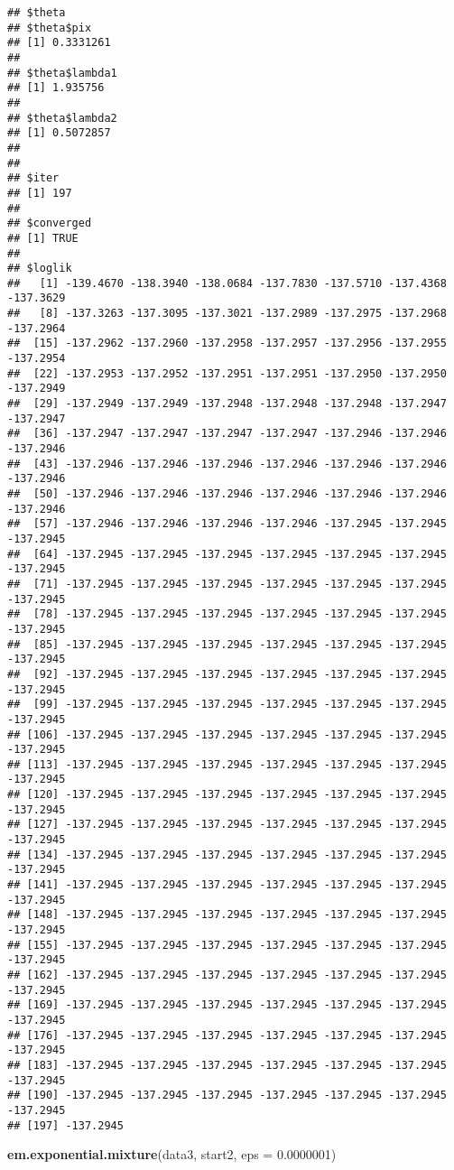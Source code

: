 \documentclass[]{article}
\newenvironment{Shaded}{\begin{snugshade}}{\end{snugshade}}
\newcommand{\DataTypeTok}[1]{\textcolor[rgb]{0.13,0.29,0.53}{#1}}
\newcommand{\FloatTok}[1]{\textcolor[rgb]{0.00,0.00,0.81}{#1}}
\newcommand{\KeywordTok}[1]{\textcolor[rgb]{0.13,0.29,0.53}{\textbf{#1}}}
\newcommand{\NormalTok}[1]{#1}
\begin{document}
\begin{verbatim}
## $theta
## $theta$pix
## [1] 0.3331261
## 
## $theta$lambda1
## [1] 1.935756
## 
## $theta$lambda2
## [1] 0.5072857
## 
## 
## $iter
## [1] 197
## 
## $converged
## [1] TRUE
## 
## $loglik
##   [1] -139.4670 -138.3940 -138.0684 -137.7830 -137.5710 -137.4368 -137.3629
##   [8] -137.3263 -137.3095 -137.3021 -137.2989 -137.2975 -137.2968 -137.2964
##  [15] -137.2962 -137.2960 -137.2958 -137.2957 -137.2956 -137.2955 -137.2954
##  [22] -137.2953 -137.2952 -137.2951 -137.2951 -137.2950 -137.2950 -137.2949
##  [29] -137.2949 -137.2949 -137.2948 -137.2948 -137.2948 -137.2947 -137.2947
##  [36] -137.2947 -137.2947 -137.2947 -137.2947 -137.2946 -137.2946 -137.2946
##  [43] -137.2946 -137.2946 -137.2946 -137.2946 -137.2946 -137.2946 -137.2946
##  [50] -137.2946 -137.2946 -137.2946 -137.2946 -137.2946 -137.2946 -137.2946
##  [57] -137.2946 -137.2946 -137.2946 -137.2946 -137.2945 -137.2945 -137.2945
##  [64] -137.2945 -137.2945 -137.2945 -137.2945 -137.2945 -137.2945 -137.2945
##  [71] -137.2945 -137.2945 -137.2945 -137.2945 -137.2945 -137.2945 -137.2945
##  [78] -137.2945 -137.2945 -137.2945 -137.2945 -137.2945 -137.2945 -137.2945
##  [85] -137.2945 -137.2945 -137.2945 -137.2945 -137.2945 -137.2945 -137.2945
##  [92] -137.2945 -137.2945 -137.2945 -137.2945 -137.2945 -137.2945 -137.2945
##  [99] -137.2945 -137.2945 -137.2945 -137.2945 -137.2945 -137.2945 -137.2945
## [106] -137.2945 -137.2945 -137.2945 -137.2945 -137.2945 -137.2945 -137.2945
## [113] -137.2945 -137.2945 -137.2945 -137.2945 -137.2945 -137.2945 -137.2945
## [120] -137.2945 -137.2945 -137.2945 -137.2945 -137.2945 -137.2945 -137.2945
## [127] -137.2945 -137.2945 -137.2945 -137.2945 -137.2945 -137.2945 -137.2945
## [134] -137.2945 -137.2945 -137.2945 -137.2945 -137.2945 -137.2945 -137.2945
## [141] -137.2945 -137.2945 -137.2945 -137.2945 -137.2945 -137.2945 -137.2945
## [148] -137.2945 -137.2945 -137.2945 -137.2945 -137.2945 -137.2945 -137.2945
## [155] -137.2945 -137.2945 -137.2945 -137.2945 -137.2945 -137.2945 -137.2945
## [162] -137.2945 -137.2945 -137.2945 -137.2945 -137.2945 -137.2945 -137.2945
## [169] -137.2945 -137.2945 -137.2945 -137.2945 -137.2945 -137.2945 -137.2945
## [176] -137.2945 -137.2945 -137.2945 -137.2945 -137.2945 -137.2945 -137.2945
## [183] -137.2945 -137.2945 -137.2945 -137.2945 -137.2945 -137.2945 -137.2945
## [190] -137.2945 -137.2945 -137.2945 -137.2945 -137.2945 -137.2945 -137.2945
## [197] -137.2945
\end{verbatim}

\begin{Shaded}
\begin{Highlighting}[]
\KeywordTok{em.exponential.mixture}\NormalTok{(data3, start2, }\DataTypeTok{eps =} \FloatTok{0.0000001}\NormalTok{)}
\end{Highlighting}
\end{Shaded}
\end{document}
